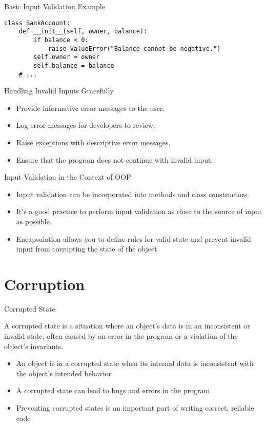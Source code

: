 \documentclass[handout]{beamer}
\begin{document}
\begin{frame}[fragile]{Basic Input Validation Example}
    \begin{lstlisting}[style=python]
class BankAccount:
    def __init__(self, owner, balance):
        if balance < 0:
            raise ValueError("Balance cannot be negative.")
        self.owner = owner
        self.balance = balance
    # ...
    \end{lstlisting}
\end{frame}

\begin{frame}[fragile]{Handling Invalid Inputs Gracefully}
    \begin{itemize}
        \item Provide informative error messages to the user.
        \item Log error messages for developers to review.
        \item Raise exceptions with descriptive error messages.
        \item Ensure that the program does not continue with invalid input.
    \end{itemize}
\end{frame}

\begin{frame}[fragile]{Input Validation in the Context of OOP}
    \begin{itemize}
        \item Input validation can be incorporated into methods and class constructors.
        \item It's a good practice to perform input validation as close to the source of input as possible.
        \item Encapsulation allows you to define rules for valid state and prevent invalid input from corrupting the state of the object.
    \end{itemize}
\end{frame}

\section{Corruption}

\begin{frame}[fragile]{Corrupted State}
    
    A corrupted state is a situation where an object's data is in an inconsistent or invalid state, often caused by an error in the program or a violation of the object's invariants.
    
    \begin{itemize}
        \item An object is in a corrupted state when its internal data is inconsistent with the object's intended behavior
        \item A corrupted state can lead to bugs and errors in the program
        \item Preventing corrupted states is an important part of writing correct, reliable code
    \end{itemize}
    
\end{frame}
\end{document}

